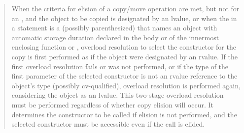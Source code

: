 \begin{quote}
\setcounter{Paras}{32}
\pnum
When the criteria for elision of a copy/move operation are met,
but not for an ,
and the object
to be copied is designated by an lvalue,
or when the  in a    statement
is a (possibly parenthesized) 
that names an object with automatic storage duration declared in the body
or  of the innermost enclosing
function or ,
overload resolution to select the constructor
for the copy  is first performed as if the object were designated by an rvalue.
If the first overload resolution fails or was not performed,
or if the type of the first parameter of the selected
constructor is not an rvalue reference to the object's type (possibly cv-qualified),
overload resolution is performed again, considering the object as an lvalue.
\enternote This two-stage overload resolution must be performed regardless
of whether copy elision will occur. It determines the constructor to be called if
elision is not performed, and the selected constructor must be accessible even if
the call is elided. \exitnote
\end{quote}